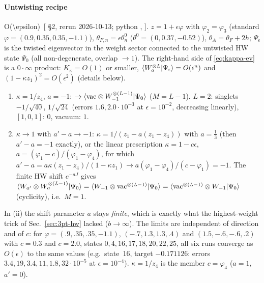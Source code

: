 \paragraph{Untwisting recipe} \num{O(\epsilon)}\ [ \S2, rerun 2026-10-13; python , ]. $z=1+\epsilon\varphi$ with $\varphi_2=\varphi_3$ (standard $\varphi=(0.9,0.35,0.35,-1.1)$),
$\theta_{F,n}=\epsilon\theta^0_n$ ($\theta^0=(0,0.37,-0.52)$), $\theta_A=\theta_F+2h$; $\Psi_\epsilon$ is the twisted eigenvector in the weight sector connected to the untwisted HW state $\Psi_0$ (all non-degenerate, overlap $\to1$).
The right-hand side of \eqref{eq:kappa-ev} is a $0\cdot\infty$ product: $K_\kappa=O(1)$ or smaller, $\langle W_a^{\otimes L}|\Psi_\epsilon\rangle=O(\epsilon^n)$ and $(1-\kappa z_1)^2=O(\epsilon^2)$ (details below).
\begin{enumerate}
\item[(i)] $\kappa=1/z_4$, $a=-1$: $\to\langle\mathrm{vac}\otimes W_{-1}^{\otimes(L-1)}|\Psi_0\rangle$ ($M=L-1$). $L=2$: singlets $-1/\sqrt{40}$, $1/\sqrt{24}$ (errors $1.6,2.0\cdot10^{-3}$ at $\epsilon=10^{-2}$, decreasing linearly), $[1,0,1]$: $0$, vacuum: $1$.
\item[(ii)] $\kappa\to1$ with $a'-a\to-1$: $\kappa=1/(z_1-a(z_1-z_4))$ with $a=\tfrac13$ (then $a'-a=-1$ exactly), or the linear prescription $\kappa=1-c\epsilon$, $a=(\varphi_1-c)/(\varphi_1-\varphi_4)$, for which
$a'-a=a\kappa(z_1-z_4)/(1-\kappa z_1)\to a(\varphi_1-\varphi_4)/(c-\varphi_1)=-1$. The finite HW shift $e^{-aJ}$ gives
$\langle W_{a'}\otimes W_a^{\otimes(L-1)}|\Psi_0\rangle=\langle W_{-1}\otimes\mathrm{vac}^{\otimes(L-1)}|\Psi_0\rangle=\langle\mathrm{vac}^{\otimes(L-1)}\otimes W_{-1}|\Psi_0\rangle$ (cyclicity), i.e.\ $M=1$.
\end{enumerate}
In (ii) the shift parameter $a$ stays \emph{finite}, which is exactly what the highest-weight trick of Sec.~\ref{sec:3pt-hw} lacked ($b\to\infty$). The limits are independent of direction and of $c$: for $\varphi=(.9,.35,.35,-1.1)$, $(-.7,1.3,1.3,.4)$ and $(1.5,-.6,-.6,.2)$ with
$c=0.3$ and $c=2.0$, states $0,4,16,17,18,20,22,25$, all six runs converge as $O(\epsilon)$ to the same values (e.g.\ state~16, target $-0.171126$: errors $3.4,19,3.4,11,1.8,32\cdot10^{-5}$ at $\epsilon=10^{-4}$). $\kappa=1/z_4$ is the member $c=\varphi_4$ ($a=1$, $a'=0$).

